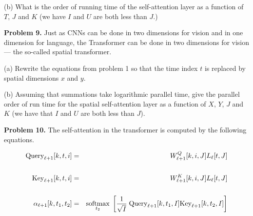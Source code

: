 \documentclass{article}
\newcommand{\solution}[1]{}
\begin{document}
\medskip
(b) What is the order of running time of the self-attention layer as a function of $T$, $J$ and $K$ (we have $I$ and $U$ are both less than $J$.)

\solution{$O(\ln T + \ln J)$.  In practice the inner products would be done serially which would give $O(J + \ln T)$.}


\bigskip

{\bf Problem 9.}
Just as CNNs can be done in two dimensions for vision and in one dimension for language, the Transformer can be done in two dimensions for vision --- the so-called spatial transformer.

\medskip
(a) Rewrite the equations from problem 1 so that the time index $t$ is replaced by spatial dimensions $x$ and $y$.

\solution{

\begin{eqnarray*}
\mathrm{Query}[k,x,y,U] & = & W^Q[k,U,J]h_\mathrm{in}[x,y,J] \\
\\
\mathrm{Key}[k,x,y,U] & = &  W^K[k,U,J]h_\mathrm{in}[x,y,J] \\
\\
\alpha[k,x_1,y_1,x_2,y_2] & = & \softmax_{x_2,y_2}\; \mathrm{Query}[k,x_1,y_1,U]\mathrm{Key}[k,x_2,y_2,U]\\
\\
\mathrm{Value}[k,x,y,I] & = & W^V[k,I,J]h_\mathrm{in}[x,y,J] \\
\\
\mathrm{Out}[k,x,y,I] & = & \sum_{x',y'}\alpha[k,x,y,x',y']\mathrm{Value}[k,x',y',I] \\
\\
h_\mathrm{out}[x,y,J] & = & \mathrm{Out}[1,x,y,I];\cdots;\mathrm{Out}[K,x,y,I]
\end{eqnarray*}
}

\medskip
(b) Assuming that summations take logarithmic parallel time, give the parallel order of run time for the spatial self-attention layer as a function
of $X$, $Y$, $J$ and $K$ (we have that $I$ and $U$ are both less than $J$).

\solution{$O(\ln XY + \ln J)$}


\bigskip
{\bf Problem 10.} The self-attention in the transformer is computed by the following equations.

\begin{eqnarray*}
\mathrm{Query}_{\ell+1}[k,t,i] & = & W^Q_{\ell+1}[k,i,J]L_\ell[t,J] \\
\\
\mathrm{Key}_{\ell+1}[k,t,i] & = &  W^K_{\ell+1}[k,i,J]L_\ell[t,J] \\
\\
\alpha_{\ell+1}[k,t_1,t_2] & = & \operatorname*{softmax}_{t_2}\; \left[\frac{1}{\sqrt{I}}\;\mathrm{Query}_{\ell+1}[k,t_1,I]\mathrm{Key}_{\ell+1}[k,t_2,I]\right]
\end{eqnarray*}
\end{document}

